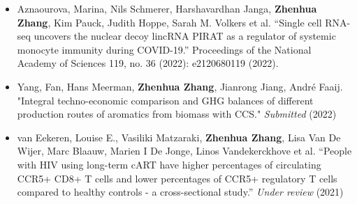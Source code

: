 \documentclass[10pt,A4,english]{article}
\begin{document}
\begin{paracol}{2}
\begin{rightcolumn}
\begin{itemize}[leftmargin=*]
  \item Aznaourova, Marina, Nils Schmerer, Harshavardhan Janga, \textbf{Zhenhua Zhang}, Kim Pauck, Judith Hoppe, Sarah M. Volkers et al. \enquote{Single cell RNA-seq uncovers the nuclear decoy lincRNA PIRAT as a regulator of systemic monocyte immunity during COVID-19.} Proceedings of the National Academy of Sciences 119, no. 36 (2022): e2120680119 (2022).
  \item Yang, Fan, Hans Meerman, \textbf{Zhenhua Zhang}, Jianrong Jiang, André Faaij. "Integral techno-economic comparison and GHG balances of different production routes of aromatics from biomass with CCS." \textit{Submitted} (2022)
  \item van Eekeren, Louise E., Vasiliki Matzaraki, \textbf{Zhenhua Zhang}, Lisa Van De Wijer, Marc Blaauw, Marien I De Jonge, Linos Vandekerckhove et al. \enquote{People with HIV using long-term cART have higher percentages of circulating CCR5+ CD8+ T cells and lower percentages of CCR5+ regulatory T cells compared to healthy controls - a cross-sectional study.} \textit{Under review} (2021)
\end{itemize}


\end{rightcolumn}
\end{paracol}
\end{document}
